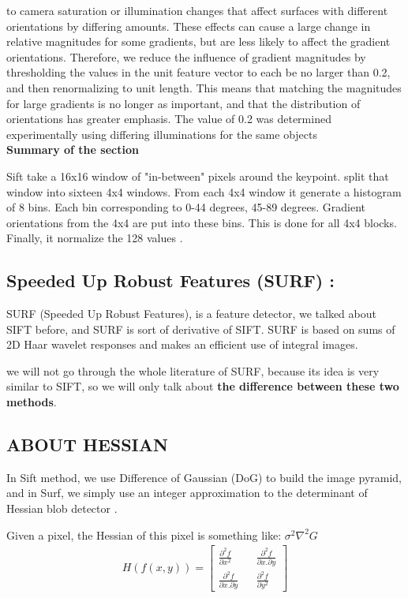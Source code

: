 to camera saturation or illumination changes that affect surfaces with different orientations
by differing amounts. These effects can cause a large change in relative magnitudes for
some gradients, but are less likely to affect the gradient orientations. Therefore, we reduce
the influence of gradient magnitudes by thresholding the values in the unit feature vector to
each be no larger than 0.2, and then renormalizing to unit length. This means that matching
the magnitudes for large gradients is no longer as important, and that the distribution of
orientations has greater emphasis. The value of 0.2 was determined experimentally using
differing illuminations for the same objects\\

\textbf{Summary of the section }

Sift take  a 16x16 window of "in-between" pixels around the keypoint. split that window into sixteen 4x4 windows. From each 4x4 window it generate a histogram of 8 bins. Each bin corresponding to 0-44 degrees, 45-89 degrees. Gradient orientations from the 4x4 are put into these bins. This is done for all 4x4 blocks. Finally, it normalize the 128 values .

\subsection{Speeded Up Robust Features (SURF) :} \label{surf}
SURF (Speeded Up Robust Features), is a feature detector, we talked about SIFT before, and SURF is sort of derivative of SIFT. SURF is based on sums of 2D Haar wavelet responses and makes an efficient use of integral images.

we will not go through  the whole literature  of SURF, because its idea is very similar to SIFT, so we will only talk about \textbf{the difference between these two methods}.

\subsection{ABOUT HESSIAN}
In Sift method, we use Difference of Gaussian (DoG) to build the image pyramid, and in Surf, we simply use an integer approximation to the determinant of Hessian blob detector .

Given a pixel, the Hessian of this pixel is something like:
$\sigma^2\nabla^2G$ \\

\begin{gather}
H(f(x,y)) =
\begin{bmatrix}
                 {\frac {\partial^2 f} {\partial x^2}} && { \frac {\partial^2 f} {\partial x.\partial y} }\\
                 {\frac  {\partial^2 f}{\partial x.\partial y}} && { \frac {\partial^2 f} {\partial y^2}}
\end{bmatrix}
\end{gather}

